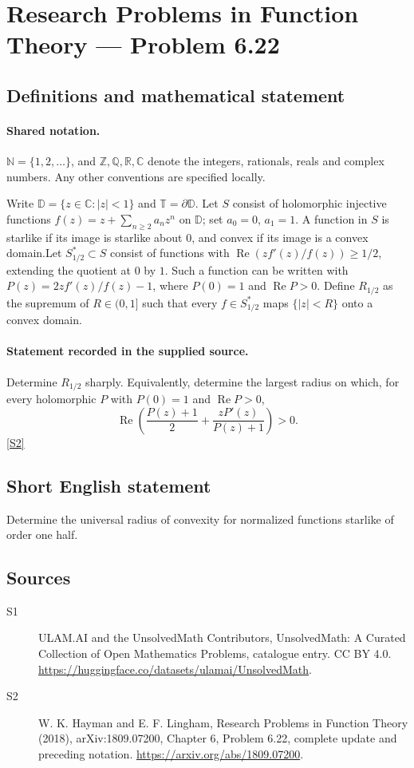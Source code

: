\documentclass[11pt]{article}
\newcommand{\sref}[2]{\hyperlink{source:#1:#2}{[S#2]}}
\begin{document}
\section{Research Problems in Function Theory — Problem 6.22}\label{statement}

\subsection{Definitions and mathematical statement}

\paragraph{Shared notation.}$\mathbb N=\{1,2,\ldots\}$, and $\mathbb Z,\mathbb Q,\mathbb R,\mathbb C$ denote the integers, rationals, reals and complex numbers. Any other conventions are specified locally.


Write $\mathbb D=\{z\in\mathbb C:|z|<1\}$ and $\mathbb T=\partial\mathbb D$. Let $S$ consist of holomorphic injective functions $f(z)=z+\sum_{n\ge2}a_nz^n$ on $\mathbb D$; set $a_0=0$, $a_1=1$. A function in $S$ is starlike if its image is starlike about $0$, and convex if its image is a convex domain.Let $S_{1/2}^*\subset S$ consist of functions with $\operatorname{Re}(zf'(z)/f(z))\ge1/2$, extending the quotient at $0$ by $1$. Such a function can be written with $P(z)=2zf'(z)/f(z)-1$, where $P(0)=1$ and $\operatorname{Re}P>0$. Define $R_{1/2}$ as the supremum of $R\in(0,1]$ such that every $f\in S_{1/2}^*$ maps $\{|z|<R\}$ onto a convex domain.
\paragraph{Statement recorded in the supplied source.}
Determine $R_{1/2}$ sharply. Equivalently, determine the largest radius on which, for every holomorphic $P$ with $P(0)=1$ and $\operatorname{Re}P>0$,
\[\operatorname{Re}\left(\frac{P(z)+1}{2}+\frac{zP'(z)}{P(z)+1}\right)>0.\] \sref{statement}{2}
\subsection{Short English statement}
Determine the universal radius of convexity for normalized functions starlike of order one half.
\subsection{Sources}
\begin{description}
\item[\hypertarget{source:statement:1}{S1}] ULAM.AI and the UnsolvedMath Contributors, UnsolvedMath: A Curated Collection of Open Mathematics Problems, catalogue entry. CC BY 4.0. \url{https://huggingface.co/datasets/ulamai/UnsolvedMath}.
\item[\hypertarget{source:statement:2}{S2}] W. K. Hayman and E. F. Lingham, Research Problems in Function Theory (2018), arXiv:1809.07200, Chapter 6, Problem 6.22, complete update and preceding notation. \url{https://arxiv.org/abs/1809.07200}.
\end{description}
\label{end:statement}
\end{document}
